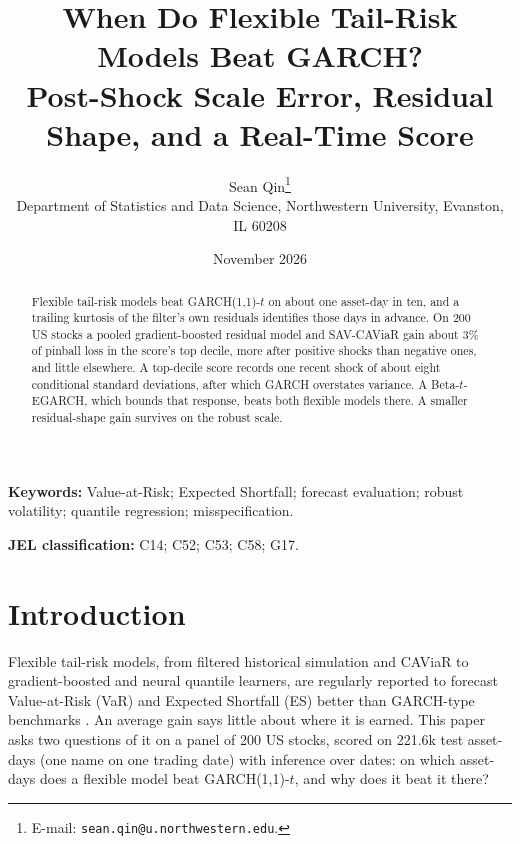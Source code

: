 \documentclass[11pt]{article}
\title{When Do Flexible Tail-Risk Models Beat GARCH?\\
\large Post-Shock Scale Error, Residual Shape, and a Real-Time Score}
\author{%
  Sean Qin\thanks{E-mail: \texttt{sean.qin@u.northwestern.edu}.}\\[4pt]
  \normalsize Department of Statistics and Data Science, Northwestern
  University, Evanston, IL 60208}
\date{November 2026}
\theoremstyle{remark}
\begin{document}
\maketitle

\begin{abstract}
Flexible tail-risk models beat GARCH(1,1)-$t$ on about one asset-day in ten, and a trailing kurtosis of the filter's own residuals identifies those days in advance. On 200 US stocks a pooled gradient-boosted residual model and SAV-CAViaR gain about 3\% of pinball loss in the score's top decile, more after positive shocks than negative ones, and little elsewhere. A top-decile score records one recent shock of about eight conditional standard deviations, after which GARCH overstates variance. A Beta-$t$-EGARCH, which bounds that response, beats both flexible models there. A smaller residual-shape gain survives on the robust scale.
\end{abstract}

\noindent\textbf{Keywords:} Value-at-Risk; Expected Shortfall;
forecast evaluation; robust volatility; quantile regression; misspecification.

\medskip
\noindent\textbf{JEL classification:} C14; C52; C53; C58; G17.

\section*{Introduction}\label{sec:intro}

Flexible tail-risk models, from filtered historical simulation and CAViaR to gradient-boosted and neural quantile learners, are regularly reported to forecast Value-at-Risk (VaR) and Expected Shortfall (ES) better than GARCH-type benchmarks \citep{kuester2006, nietoruiz2016, chronopoulos2024}. An average gain says little about where it is earned. This paper asks two questions of it on a panel of 200 US stocks, scored on 221.6k test asset-days (one name on one trading date) with inference over dates: on which asset-days does a flexible model beat GARCH(1,1)-$t$, and why does it beat it there?
\end{document}
